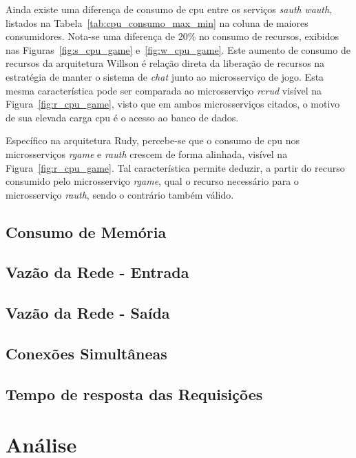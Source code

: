 Ainda existe uma diferença de consumo de \ac{cpu} entre os serviços \textit{sauth} \textit{wauth}, listados na Tabela~\ref{tab:cpu_consumo_max_min} na coluna de maiores consumidores.
%
Nota-se uma diferença de 20\% no consumo de recursos, exibidos nas Figuras~\ref{fig:s_cpu_game} e~\ref{fig:w_cpu_game}.
%
Este aumento de consumo de recursos da arquitetura Willson é relação direta da liberação de recursos na estratégia de manter o sistema de \textit{chat} junto ao microsserviço de jogo.
%
Esta mesma característica pode ser comparada ao microsserviço \textit{rcrud} visível na Figura~\ref{fig:r_cpu_game}, visto que em ambos microsserviços citados, o motivo de sua elevada carga \ac{cpu} é o acesso ao banco de dados.

Específico na arquitetura Rudy, percebe-se que o consumo de \ac{cpu} nos microsserviços \textit{rgame} e \textit{rauth} crescem de forma alinhada, visível na Figura~\ref{fig:r_cpu_game}.
%
Tal característica permite deduzir, a partir do recurso consumido pelo microsserviço \textit{rgame}, qual o recurso necessário para o microsserviço \textit{rauth}, sendo o contrário também válido.

\subsection{Consumo de Memória}

\subsection{Vazão da Rede - Entrada}

\subsection{Vazão da Rede - Saída}

\subsection{Conexões Simultâneas}

\subsection{Tempo de resposta das Requisições}

\section{Análise}

